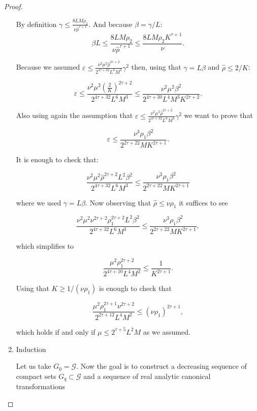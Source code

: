 \begin{proof}
\begin{enumerate}
By definition $\gamma \leq \frac{8LM\rho_2}{\nu \hat \rho^{\tau+1}}$. And because $\beta = \gamma/L$:
$$\beta L \leq \frac{8L M \rho_2}{\nu \hat \rho^{\tau+1}} \leq \frac{8L M \rho_2 K^{\tau+1}}{\nu}.$$

Because we assumed $\varepsilon \leq \frac{\nu^2 \mu^2 \hat\rho^{2\tau+2}}{2^{4\tau + 32} L ^6 M^3} \gamma^2$ then, using that $\gamma = L\beta$ and $\hat \rho \leq 2/K$:

\begin{equation}\label{eq:kam_epsilon_1}
\varepsilon \leq \frac{\nu^2 \mu^2 \left(\frac{2}{K}\right)^{2\tau+2}}{2^{4\tau + 32} L ^6 M^3} \leq \frac{\nu^2 \mu^2 \beta^2}{2^{4\tau + 30} L ^4 M^3 K^{2\tau+2}}.
\end{equation}

Also using again the assumption that $\varepsilon \leq \frac{\nu^2 \mu^2 \hat \rho^{2\tau+2}}{2^{4\tau+32} L^6 M^3} \gamma^2$ we want to prove that

\begin{equation}\label{eq:kam_epsilon_2}
\varepsilon \leq \frac{\nu^3 \rho_1 \beta^2}{2^{2\tau+22} M K^{2\tau +1}}.
\end{equation}

 It is enough to check that:

$$\frac{\nu^2 \mu^2 \hat \rho^{2\tau+2} L^2 \beta^2}{2^{4\tau + 32} L^6 M^3} \leq \frac{\nu^3 \rho_1 \beta^2}{2^{2\tau + 22} M K^{2\tau+1}}$$

where we used $\gamma = L\beta$. Now observing that $\hat \rho \leq \nu \rho_1$ it suffices to see

$$\frac{\nu^2 \mu^2 \nu^{2\tau + 2} \rho_1^{2\tau +2} L^2 \beta^2}{2^{4\tau + 32} L^6 M^3}\leq\frac{\nu^3 \rho_1 \beta^2}{2^{2\tau+22} M K^{2\tau+1}},$$

which simplifies to

$$\frac{\mu^2 \rho_1^{2\tau+2}}{2^{4\tau+10}L^4M^2} \leq \frac{1}{K^{2\tau+1}}.$$

Using that $K \geq 1/(\nu\rho_1)$ is enough to check that

$$\frac{\mu^2 \rho_1^{2\tau+1}\nu^{2\tau+2}}{2^{2\tau+12} L^4 M^2} \leq (\nu \rho_1)^{2\tau+1},$$

which holds if and only if $\mu \leq 2^{\tau+5}L^2 M$ as we assumed.

\item Induction

Let us take $G_0 = \mathcal{G}$.
Now the goal is to construct a decreasing sequence of compact sets $G_q \subset \mathcal{G}$ and a sequence of real analytic canonical transformations


\end{enumerate}
\end{proof}
